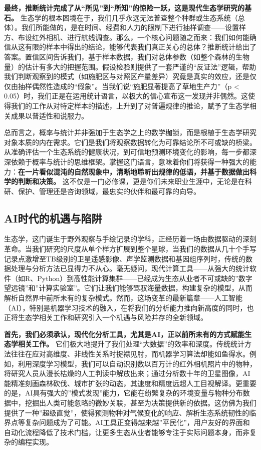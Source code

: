 \documentclass[
  twoside]{book}
\begin{document}
\textbf{最终，推断统计完成了从``所见''到``所知''的惊险一跃，这是现代生态学研究的基石。} 生态学的根本困境在于，我们几乎永远无法普查整个种群或生态系统（总体）。我们所能做的，是在时间、经费和人力的限制下进行抽样调查------设置样方、布设红外相机、进行航线调查。那么，一个核心问题随之而来：我们如何能确信从这有限的样本中得出的结论，能够代表我们真正关心的总体？推断统计给出了答案。置信区间告诉我们，基于样本数据，我们对总体参数（如整个森林的生物量）的估计有多大的把握范围。假设检验则提供了一套严谨的``反证法''逻辑，帮助我们判断观察到的模式（如施肥区与对照区产量差异）究竟是真实的效应，还是仅仅由抽样偶然性造成的``假象''。当我们说``施肥显著提高了草地生产力''（p \textless{} 0.05）时，我们正是在运用统计语言，以极大的信心宣布这一发现并非偶然。这使得我们的工作从对特定样本的描述，上升到了对普遍规律的推论，赋予了生态学相关成果以普适性和说服力。

总而言之，概率与统计并非强加于生态学之上的数学枷锁，而是根植于生态学研究对象本质的内在需求。它们是我们将观察数据转化为可靠结论所不可或缺的桥梁。从准确评估一个生态系统的健康状况，到可信地预测环境变化的影响，每一步都深深依赖于概率与统计的思维框架。掌握这门语言，意味着你们将获得一种强大的能力：\textbf{在一片看似混沌的自然现象中，清晰地聆听出规律的低语，并基于数据做出科学的判断和决策。} 这不仅是一门必修课，更是你们未来职业生涯中，无论是在科研、保护、管理还是咨询领域，最忠实的伙伴和最可靠的向导。

\hypertarget{aiux65f6ux4ee3ux7684ux673aux9047ux4e0eux9677ux9631}{%
\subsection{AI时代的机遇与陷阱}\label{aiux65f6ux4ee3ux7684ux673aux9047ux4e0eux9677ux9631}}

生态学，这门诞生于野外观察与手绘记录的学科，正经历着一场由数据驱动的深刻革命。当我们研究的尺度从单个样方扩展到整个星球，当我们的数据从几十个手写记录点激增至TB级别的卫星遥感影像、声学监测数据和基因组序列时，传统的数据处理与分析方法已显得力不从心。毫无疑问，现代计算工具------从强大的统计软件（如R、Python）到高性能计算集群------已经成为生态从业者不可或缺的''数字望远镜''和''计算实验室''。它们让我们能够驾驭海量数据，构建复杂的模型，从而解析自然界中前所未有的复杂模式。然而，这场变革的最新篇章------人工智能（AI），特别是机器学习技术的融入，在将我们的分析能力推向新高度的同时，也正将生态学相关工作和研究引入一个机遇与风险并存的全新领域。

\textbf{首先，我们必须承认，现代化分析工具，尤其是AI，正以前所未有的方式赋能生态学相关工作。} 它们极大地提升了我们处理``大数据''的效率和深度。传统统计方法往往在应对高维度、非线性关系时捉襟见肘，而机器学习算法却能如鱼得水。例如，利用深度学习模型，我们可以自动识别数以百万计的红外相机照片中的物种，将研究人员从漫长枯燥的人工判读中解放出来；通过分析数十年的卫星图像，AI能精准刻画森林砍伐、城市扩张的动态，其速度和精度远超人工目视解译。更重要的是，AI具有强大的''模式发现''能力，它能在纷繁复杂的环境变量与物种分布数据中，挖掘出人类可能忽略的微妙关联，甚至为决策提供新的依据。这仿佛为我们提供了一种''超级直觉''，使得预测物种对气候变化的响应、解析生态系统韧性的临界点等复杂问题成为了可能。AI工具正变得越来越''平民化''，用户友好的界面和自动化流程降低了技术门槛，让更多生态从业者能够专注于实际问题本身，而非复杂的编程实现。
\end{document}
